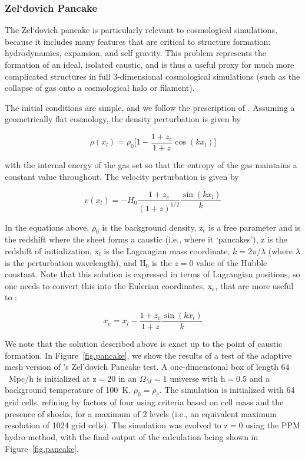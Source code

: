 \subsubsection{Zel`dovich Pancake}
\label{sec.tests.pancake}

The Zel`dovich pancake \citep{1970A&A.....5...84Z} is particularly
relevant to cosmological simulations, because it includes many
features that are critical to structure formation: hydrodynamics,
expansion, and self gravity.  This problem represents the formation of an ideal,
isolated caustic, and is thus a useful proxy for much more
complicated structures in full 3-dimensional cosmological simulations
(such as the collapse of gas onto a cosmological halo or filament).

The initial conditions are simple, and we follow the prescription of
\citet{Anninos94}.  Assuming a geometrically flat cosmology, the density
perturbation is given by

\begin{equation}
\rho(x_l) = \rho_0 \big[ 1 - \frac{1+z_c}{1+z} \cos(k x_l) \big]
\end{equation}

with the internal energy of the gas set so that the entropy of the gas
maintains a constant value throughout.  The velocity perturbation is given by

\begin{equation}
v(x_l) = -H_0 \frac{1 + z_c}{(1+z)^{1/2}} \frac{\sin(k x_l)}{k}
\end{equation}

In the equations above, $\rho_0$ is the background density, z$_c$ is a
free parameter and is the redshift where the sheet forms a caustic
(i.e., where it `pancakes'), z is the redshift of initialization, x$_l$ is the
Lagrangian mass coordinate, $k = 2 \pi / \lambda$ (where $\lambda$ is
the perturbation wavelength), and H$_0$ is the $z = 0$ value of the
Hubble constant.  Note that this solution is expressed in terms of
Lagrangian positions, so one needs to convert this into the Eulerian
coordinates, x$_e$, that are more useful to \enzo:

\begin{equation}
x_e = x_l - \frac{1 + z_c}{1 + z} \frac{\sin(k x_l)}{k}
\end{equation}

We note that the solution described above is exact up to the point of
caustic formation.  In Figure~\ref{fig.pancake}, we show the results
of a test of the adaptive mesh version of \enzo's Zel'dovich Pancake test.  A
one-dimensional box of length $64$~Mpc/h is initialized at z$ = 20$ in
an $\Omega_M = 1$ universe with h$ = 0.5$ and a background temperature
of 100~K, $\rho_0 = \rho_c$.  The simulation is initialized with 64
grid cells, refining by factors of four using criteria based on cell
mass and the presence of shocks, for a maximum of 2 levels (i.e., an
equivalent maximum resolution of 1024 grid cells).  The simulation was
evolved to z$ = 0$ using the PPM hydro method, with the final output
of the calculation being shown in Figure~\ref{fig.pancake}.

